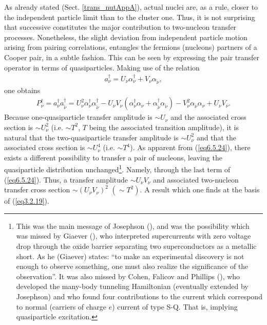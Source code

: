 As already stated (Sect. \ref{trans_nutAppA}), actual nuclei are, as a rule, closer to the independent particle limit than to the cluster one. Thus, it is not surprising that successive constitutes the major contribution to two-nucleon transfer processes. Nonetheless, the slight deviation from independent particle motion arising from pairing correlations, entangles the fermions (nucleons) partners of a Cooper pair, in a subtle fashion. This can be seen by expressing the pair transfer operator  in terms of quasiparticles. Making use of the relation
\begin{align}\label{eq6.5.23}
a^\dagger_\nu=U_\nu\alpha_\nu^\dagger+V_\nu\alpha_{\tilde\nu},
\end{align} 
one obtains 
\begin{align}\label{eq6.5.24}
P^\dagger_\nu=a^\dagger_\nu a^\dagger_{\tilde\nu}=U^2_\nu\alpha_\nu^\dagger\alpha_{\tilde\nu}^\dagger-U_\nu V_\nu(\alpha_\nu^\dagger\alpha_\nu+\alpha_{\tilde\nu}^\dagger\alpha_{\tilde\nu})-V^2_\nu\alpha_{\tilde\nu}\alpha_\nu+U_\nu V_\nu.
\end{align} 
Because one-quasiparticle transfer amplitude is $\sim U_\nu$ and the associated cross section is $\sim U^2_\nu$ (i.e. $\sim T^2$, $T$ being the associated transition amplitude), it is natural that the two-quasiparticle transfer amplitude is $\sim U^2_\nu$ and that the associated cross section is $\sim U^4_\nu$ (i.e. $\sim T^4$). As apparent from (\ref{eq6.5.24}), there exists a different possibility to transfer a pair of nucleons, leaving the quasiparticle distribution unchanged\footnote{This was the main message of Josephson (\cite{Josephson:62}), and was the possibility which was missed by Giaever (\cite{Giaver:73}), who interpreted supercurrents with zero voltage drop through the oxide barrier separating two superconductors as a metallic short. As he (Giaever) states: ``to make an experimental discovery is not enough to observe something, one must also realize the significance of the observation''. It was also missed by Cohen, Falicov and Phillips (\cite{Cohen:62}), who developed the many-body tunneling Hamiltonian (eventually extended by Josephson) and who found four contributions to the current which correspond to normal (carriers of charge $e$) current of type S-Q. That is, implying quasiparticle excitation.}. Namely, through the last term of (\ref{eq6.5.24}). Thus, a transfer amplitude $\sim U_\nu V_\nu$ and associated two-nucleon transfer cross section $\sim(U_\nu V_\nu)^2$ $(\sim T^2)$. A result which one finds at the basis of (\ref{eq3.2.19}).













